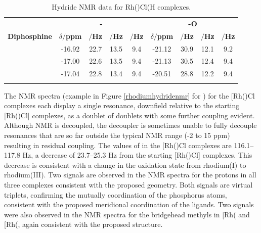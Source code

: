 \begin{table}
\caption[Hydride \proton{} NMR data for [Rh(\tBuxantphosk)Cl(\ce{H)2]}]{Hydride \proton{} NMR data for \texorpdfstring{Rh(\tBuxantphosk)Cl(H\ce{)2]}}R complexes.}
\vspace{1em}
\label{table:dihydrides}
\small
\begin{center}
\begin{tabular}{c c c c c c c c c}
\toprule{}
	~~ & \multicolumn{4}{c}{\bfseries{\ce{H-} \trans-\ce{Cl-}}} & \multicolumn{4}{c}{\bfseries{\ce{H-} \trans-O}}\\
	\cmidrule(lr){2-5} \cmidrule(lr){6-9} 
	\bfseries{Diphosphine}&\bfseries{$\delta/$ppm}&\bfseries{\JRhH$/$Hz}&\bfseries{\JPH$/$Hz}&\bfseries{\JHH$/$Hz}&\bfseries{$\delta/$ppm}&\bfseries{\JRhH$/$Hz}&\bfseries{\JPH$/$Hz}&\bfseries{\JHH$/$Hz}\\
	\midrule{}
	\tBuSixantphos & -16.92 & 22.7 & 13.5 & 9.4 & -21.12 & 30.9 & 12.1 & 9.2 \\
	\tBuThixantphos & -17.00 & 22.6 & 13.5 & 9.4 & -21.13 & 30.5 & 12.4 & 9.4 \\
	\tBuXantphos & -17.04 & 22.8 & 13.4 & 9.4 & -20.51 & 28.8 & 12.2 & 9.4 \\
	\bottomrule{}
\end{tabular}
\end{center} 
\end{table}

The \phosphorus{} NMR spectra (example in Figure \ref{rhodiumhydridenmr} for \tButhixantphos) for the [Rh(\tBuxantphosk)Cl\ce{(H)2]} complexes each display a single resonance, downfield relative to the starting [Rh(\tBuxantphosk)Cl] complexes, as a doublet of doublets with some further coupling evident.  Although \phosphorus{} NMR is \proton{} decoupled, the decoupler is sometimes unable to fully decouple resonances that are so far outside the typical \proton{} NMR range (-2 to 15 ppm) resulting in residual coupling.  The values of \JRhP{} in the [Rh(\tBuxantphosk)Cl\ce{(H)2]} complexes are 116.1--117.8 Hz, a decrease of 23.7--25.3 Hz from the starting [Rh(\tBuxantphosk)Cl] complexes.  This decrease is consistent with a change in the oxidation state from rhodium(I) to rhodium(III).\cite{Pregosin2012} Two signals are observed in the \proton{} NMR spectra for the \tBu{} protons in all three complexes consistent with the proposed geometry.  Both signals are virtual triplets, confirming the mutually \trans{} coordination of the phosphorus atoms, consistent with the proposed meridional coordination of the ligands.  Two signals were also observed in the \proton{} NMR spectra for the bridgehead methyls in [Rh(\tBuxantphosk\ce{)Cl(H)2]} and [Rh(\tBusixantphosk\ce{)Cl(H)2]}, again consistent with the proposed structure.  

